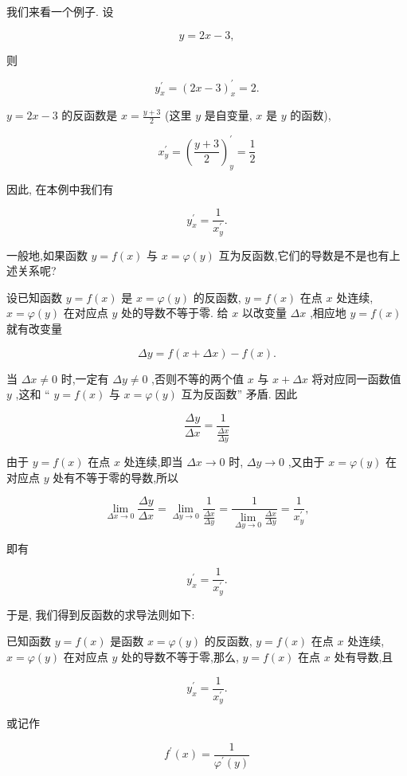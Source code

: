 \documentclass[lang=cn,newtx,12pt,scheme=chinese]{elegantbook}
\begin{document}
我们来看一个例子. 设

\[
y = {2x} - 3,
\]

则

\[
{y}_{x}^{\prime } = {\left( 2x - 3\right) }_{x}^{\prime } = 2.
\]

\(y = {2x} - 3\) 的反函数是 \(x = \frac{y + 3}{2}\) (这里 \(y\) 是自变量, \(x\) 是 \(y\) 的函数),

\[
{x}_{y}^{\prime } = {\left( \frac{y + 3}{2}\right) }_{y}^{\prime } = \frac{1}{2}
\]

因此, 在本例中我们有

\[
{y}_{x}^{\prime } = \frac{1}{{x}_{y}^{\prime }}.
\]

一般地,如果函数 \(y = f\left( x\right)\) 与 \(x = \varphi \left( y\right)\) 互为反函数,它们的导数是不是也有上述关系呢?

设已知函数 \(y = f\left( x\right)\) 是 \(x = \varphi \left( y\right)\) 的反函数, \(y = f\left( x\right)\) 在点 \(x\) 处连续, \(x = \varphi \left( y\right)\) 在对应点 \(y\) 处的导数不等于零. 给 \(x\) 以改变量 \({\Delta x}\) ,相应地 \(y = f\left( x\right)\) 就有改变量

\[
{\Delta y} = f\left( {x + {\Delta x}}\right) - f\left( x\right) .
\]

当 \({\Delta x} \neq 0\) 时,一定有 \({\Delta y} \neq 0\) ,否则不等的两个值 \(x\) 与 \(x + {\Delta x}\) 将对应同一函数值 \(y\) ,这和 “ \(y = f\left( x\right)\) 与 \(x = \varphi \left( y\right)\) 互为反函数” 矛盾. 因此

\[
\frac{\Delta y}{\Delta x} = \frac{1}{\frac{\Delta x}{\Delta y}}
\]

由于 \(y = f\left( x\right)\) 在点 \(x\) 处连续,即当 \({\Delta x} \rightarrow 0\) 时, \({\Delta y} \rightarrow 0\) ,又由于 \(x = \varphi \left( y\right)\) 在对应点 \(y\) 处有不等于零的导数,所以

\[
\mathop{\lim }\limits_{{{\Delta x} \rightarrow 0}}\frac{\Delta y}{\Delta x} = \mathop{\lim }\limits_{{{\Delta y} \rightarrow 0}}\frac{1}{\frac{\Delta x}{\Delta y}} = \frac{1}{\mathop{\lim }\limits_{{{\Delta y} \rightarrow 0}}\frac{\Delta x}{\Delta y}} = \frac{1}{{x}_{y}^{\prime }},
\]

即有

\[
{y}_{x}^{\prime } = \frac{1}{{x}_{y}^{\prime }}.
\]

于是, 我们得到反函数的求导法则如下:

\begin{proposition}[反函数的求导法则]

已知函数 \(y = f\left( x\right)\) 是函数 \(x = \varphi \left( y\right)\) 的反函数, \(y = f\left( x\right)\) 在点 \(x\) 处连续, \(x = \varphi \left( y\right)\) 在对应点 \(y\) 处的导数不等于零,那么, \(y = f\left( x\right)\) 在点 \(x\) 处有导数,且

\[
{y}_{x}^{\prime } = \frac{1}{{x}_{y}^{\prime }}\text{.}
\]

或记作

\[
{f}^{\prime }\left( x\right) = \frac{1}{{\varphi }^{\prime }\left( y\right) }
\]

\end{proposition}
\end{document}
